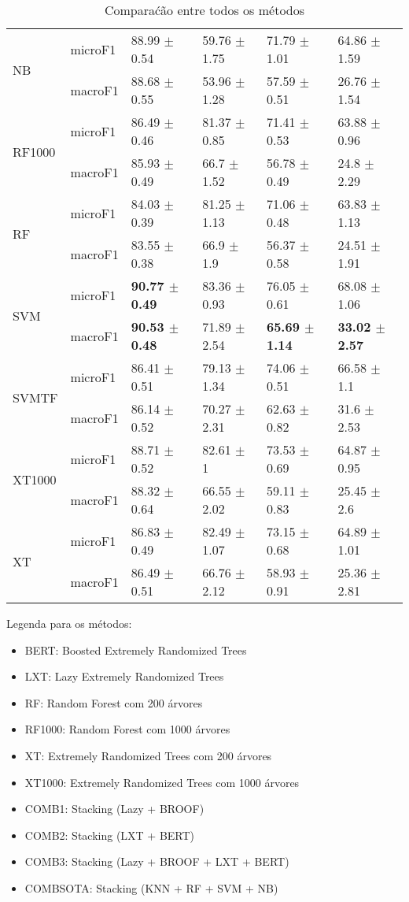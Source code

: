 \documentclass[]{article}
\begin{document}
\begin{table}[ht]
\begin{tabular}{llllll}
  \multirow{2}{*}{NB} & microF1 & 88.99 $\pm$  0.54 & 59.76 $\pm$  1.75 & 71.79 $\pm$  1.01 & 64.86 $\pm$  1.59 \\ 
   & macroF1 & 88.68 $\pm$  0.55 & 53.96 $\pm$  1.28 & 57.59 $\pm$  0.51 & 26.76 $\pm$  1.54 \\ 
  \multirow{2}{*}{RF1000} & microF1 & 86.49 $\pm$  0.46 & 81.37 $\pm$  0.85 & 71.41 $\pm$  0.53 & 63.88 $\pm$  0.96 \\ 
   & macroF1 & 85.93 $\pm$  0.49 & 66.7 $\pm$  1.52 & 56.78 $\pm$  0.49 & 24.8 $\pm$  2.29 \\ 
  \multirow{2}{*}{RF} & microF1 & 84.03 $\pm$  0.39 & 81.25 $\pm$  1.13 & 71.06 $\pm$  0.48 & 63.83 $\pm$  1.13 \\ 
   & macroF1 & 83.55 $\pm$  0.38 & 66.9 $\pm$  1.9 & 56.37 $\pm$  0.58 & 24.51 $\pm$  1.91 \\ 
  \multirow{2}{*}{SVM} & microF1 & \bf{90.77 $\pm$  0.49} & 83.36 $\pm$  0.93 & 76.05 $\pm$  0.61 & 68.08 $\pm$  1.06 \\ 
   & macroF1 & \bf{90.53 $\pm$  0.48} & 71.89 $\pm$  2.54 & \bf{65.69 $\pm$  1.14} & \bf{33.02 $\pm$  2.57} \\ 
  \multirow{2}{*}{SVMTF} & microF1 & 86.41 $\pm$  0.51 & 79.13 $\pm$  1.34 & 74.06 $\pm$  0.51 & 66.58 $\pm$  1.1 \\ 
   & macroF1 & 86.14 $\pm$  0.52 & 70.27 $\pm$  2.31 & 62.63 $\pm$  0.82 & 31.6 $\pm$  2.53 \\ 
  \multirow{2}{*}{XT1000} & microF1 & 88.71 $\pm$  0.52 & 82.61 $\pm$  1 & 73.53 $\pm$  0.69 & 64.87 $\pm$  0.95 \\ 
   & macroF1 & 88.32 $\pm$  0.64 & 66.55 $\pm$  2.02 & 59.11 $\pm$  0.83 & 25.45 $\pm$  2.6 \\ 
  \multirow{2}{*}{XT} & microF1 & 86.83 $\pm$  0.49 & 82.49 $\pm$  1.07 & 73.15 $\pm$  0.68 & 64.89 $\pm$  1.01 \\ 
   & macroF1 & 86.49 $\pm$  0.51 & 66.76 $\pm$  2.12 & 58.93 $\pm$  0.91 & 25.36 $\pm$  2.81 \\ 
   \hline
\end{tabular}
\caption{Comparaćão entre todos os métodos} 
\end{table}

Legenda para os métodos:

\begin{itemize}
\itemsep1pt\parskip0pt
\item
  BERT: Boosted Extremely Randomized Trees
\item
  LXT: Lazy Extremely Randomized Trees
\item
  RF: Random Forest com 200 árvores
\item
  RF1000: Random Forest com 1000 árvores
\item
  XT: Extremely Randomized Trees com 200 árvores
\item
  XT1000: Extremely Randomized Trees com 1000 árvores
\item
  COMB1: Stacking (Lazy + BROOF)
\item
  COMB2: Stacking (LXT + BERT)
\item
  COMB3: Stacking (Lazy + BROOF + LXT + BERT)
\item
  COMBSOTA: Stacking (KNN + RF + SVM + NB)
\end{itemize}
\end{document}
